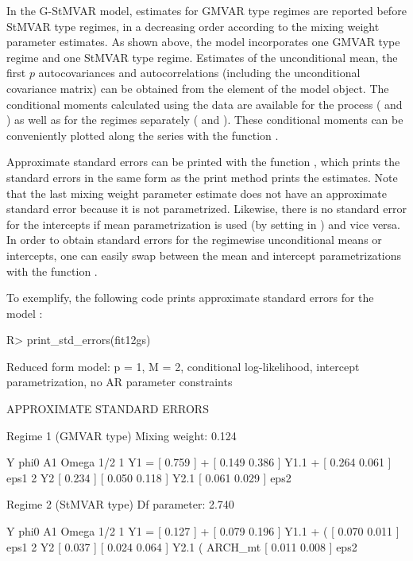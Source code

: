 \documentclass[nojss]{jss}
\begin{document}
In the G-StMVAR model, estimates for GMVAR type regimes are reported before StMVAR type regimes, in a decreasing order according to the mixing weight parameter estimates. As shown above, the model  incorporates one GMVAR type regime and one StMVAR type regime. Estimates of the unconditional mean, the first $p$ autocovariances and autocorrelations (including the unconditional covariance matrix) can be obtained from the element  of the model object. The conditional moments calculated using the data are available for the process ( and ) as well as for the regimes separately ( and ). These conditional moments can be conveniently plotted along the series with the function .

Approximate standard errors can be printed with the function , which prints the standard errors in the same form as the print method prints the estimates. Note that the last mixing weight parameter estimate does not have an approximate standard error because it is not parametrized. Likewise, there is no standard error for the intercepts if mean parametrization is used (by setting  in ) and vice versa. In order to obtain standard errors for the regimewise unconditional means or intercepts, one can easily swap between the mean and intercept parametrizations with the function .

To exemplify, the following code prints approximate standard errors for the model :
%
\begin{CodeChunk}
\begin{CodeInput}
R> print_std_errors(fit12gs)
\end{CodeInput}
\begin{CodeOutput}
Reduced form model:
p = 1, M = 2, conditional log-likelihood, intercept parametrization,
no AR parameter constraints

APPROXIMATE STANDARD ERRORS

Regime 1 (GMVAR type)
Mixing weight: 0.124

   Y      phi0          A1                  Omega         1/2
1 Y1 = [ 0.759 ] + [ 0.149 0.386 ] Y1.1 + [ 0.264 0.061 ]     eps1
2 Y2   [ 0.234 ]   [ 0.050 0.118 ] Y2.1   [ 0.061 0.029 ]     eps2

Regime 2 (StMVAR type)
Df parameter:  2.740

   Y      phi0          A1                            Omega         1/2
1 Y1 = [ 0.127 ] + [ 0.079 0.196 ] Y1.1 + (         [ 0.070 0.011 ]     eps1
2 Y2   [ 0.037 ]   [ 0.024 0.064 ] Y2.1   ( ARCH_mt [ 0.011 0.008 ]     eps2
\end{CodeOutput}
\end{CodeChunk}
%
\end{document}
